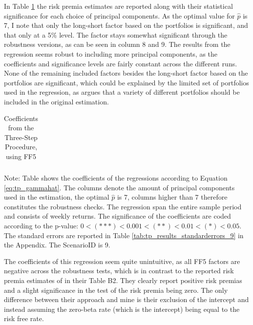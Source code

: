 In Table \ref{tab:tp_results_9} the risk premia estimates are reported along with their statistical significance for each choice of principal components. As the optimal value for $\hat{p}$ is 7, I note that only the long-short factor based on the portfolios is significant, and that only at a 5\% level. The factor stays somewhat significant through the robustness versions, as can be seen in column 8 and 9. The results from the regression seems robust to including more principal components, as the coefficients and significance levels are fairly constant across the different runs. None of the remaining included factors besides the long-short factor based on the portfolios are significant, which could be explained by the limited set of portfolios used in the regression, as \cite{giglio2021asset} argues that a variety of different portfolios should be included in the original estimation. 

\begin{table}[h]
	\centering
	
	\caption[Three-Step Procedure, Coefficients]{Coefficients from the Three-Step Procedure, using FF5}
	\label{tab:tp_results_9}
	{\footnotesize
	\begin{tabular}{l|lllllllll}
		
	\end{tabular}
	}
	
	{\small Note: Table shows the coefficients of the regressions according to Equation \ref{eq:tp_gammahat}. The columns denote the amount of principal components used in the estimation, the optimal $\hat{p}$ is 7, columns higher than 7 therefore constitutes the robustness checks. The regression span the entire sample period and consists of weekly returns. The significance of  the coefficients are coded according to the p-value: $0 < (\ast\ast\ast) < 0.001 < (\ast\ast) < 0.01 < (\ast) < 0.05$. The standard errors are reported in Table \ref{tab:tp_results_standarderrors_9} in the Appendix. The ScenarioID is 9.}
	
\end{table}

The coefficients of this regression seem quite unintuitive, as all FF5 factors are negative across the robustness tests, which is in contrast to the reported risk premia estimates of \cite{giglio2021asset} in their Table B2. They clearly report positive risk premias and a slight significance in the test of the risk premia being zero. The only difference between their approach and mine is their exclusion of the intercept and instead assuming the zero-beta rate (which is the intercept) being equal to the risk free rate. 

